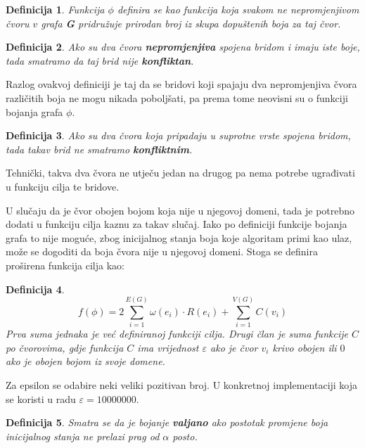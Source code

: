 \documentclass[times, utf8, diplomski, numeric]{fer}
\newtheorem{definition}{Definicija}
\begin{document}
\begin{definition}
Funkcija $\phi$ definira se kao funkcija koja svakom ne nepromjenjivom čvoru $v$ grafa \textbf{G} pridružuje prirodan broj iz skupa dopuštenih boja za taj čvor.
\end{definition}

\begin{definition}
Ako su dva čvora \textbf{nepromjenjiva} spojena bridom i imaju iste boje, tada smatramo da taj brid nije \textbf{konfliktan}.
\end{definition}

Razlog ovakvoj definiciji je taj da se bridovi koji spajaju dva nepromjenjiva čvora različitih boja ne mogu nikada poboljšati, pa prema tome neovisni su o funkciji bojanja grafa $\phi$.

\begin{definition}
Ako su dva čvora koja pripadaju u suprotne vrste spojena bridom, tada takav brid ne smatramo \textbf{konfliktnim}.
\end{definition}

Tehnički, takva dva čvora ne utječu jedan na drugog pa nema potrebe  ugrađivati u funkciju cilja te bridove.

U slučaju da je čvor obojen bojom koja nije u njegovoj domeni, tada je potrebno dodati u funkciju cilja kaznu za takav slučaj. Iako po definiciji funkcije bojanja grafa to nije moguće, zbog inicijalnog stanja boja koje algoritam primi kao ulaz, može se dogoditi da boja čvora nije u njegovoj domeni. Stoga se definira proširena funkcija cilja kao:

\begin{definition}
\begin{equation}
\label{equ:funkcija_cilja}
f(\phi) = 2\sum_{i=1}^{E(G)} \omega(e_i) \cdot R(e_i) + \sum_{i=1}^{V(G)} C(v_i)
\end{equation}
Prva suma jednaka je već definiranoj funkciji cilja. Drugi član je suma funkcije $C$ po čvorovima, gdje funkcija $C$ ima vrijednost $\varepsilon$ ako je čvor $v_i$ krivo obojen ili $0$ ako je obojen bojom iz svoje domene.
\end{definition}

Za epsilon se odabire neki veliki pozitivan broj. U konkretnoj implementaciji koja se koristi u radu $\varepsilon=10000000$.

\begin{definition}
Smatra se da je bojanje \textbf{valjano} ako postotak promjene boja inicijalnog stanja ne prelazi prag od $\alpha$ posto.
\end{definition}
\end{document}

